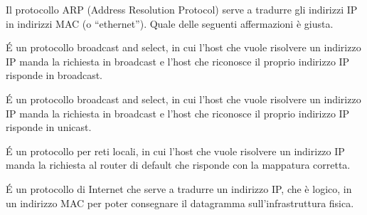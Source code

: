 \question
Il protocollo ARP (Address Resolution Protocol) serve a tradurre gli indirizzi IP in indirizzi MAC (o \enquote{ethernet}). %
Quale delle seguenti affermazioni è giusta.

\begin{checkboxes}
	\choice \'E un protocollo broadcast and select, in cui l'host che vuole risolvere un indirizzo IP manda la richiesta in broadcast e l'host che riconosce il proprio indirizzo IP risponde in broadcast.

	\CorrectChoice \'E un protocollo broadcast and select, in cui l'host che vuole risolvere un indirizzo IP manda la richiesta in broadcast e l'host che riconosce il proprio indirizzo IP risponde in unicast.

	\choice \'E un protocollo per reti locali, in cui l'host che vuole risolvere un indirizzo IP manda la richiesta al router di default che risponde con la mappatura corretta.

	\choice \'E un protocollo di Internet che serve a tradurre un indirizzo IP, che è logico, in un indirizzo MAC per poter consegnare il datagramma sull'infrastruttura fisica.
\end{checkboxes}
